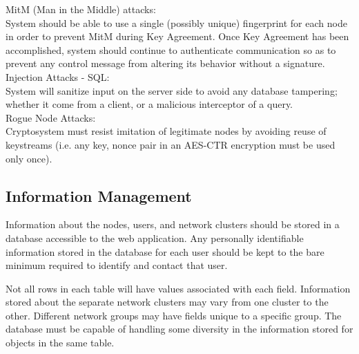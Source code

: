\documentclass[tikz,a4paper,titlepage]{article}
\begin{document}
MitM (Man in the Middle) attacks:\\
System should be able to use a single (possibly unique) fingerprint for each node in order to prevent MitM during Key Agreement. Once Key Agreement has been accomplished, system should continue to authenticate communication so as to prevent any control message from altering its behavior without a signature.\\

Injection Attacks - SQL:\\
System will sanitize input on the server side to avoid any database tampering; whether it come from a client, or a malicious interceptor of a query. \\

Rogue Node Attacks:\\
Cryptosystem must resist imitation of legitimate nodes by avoiding reuse of keystreams (i.e. any key, nonce pair in an AES-CTR encryption must be used only once). \\
    
\subsection{Information Management} %

Information about the nodes, users, and network clusters should be stored in a database accessible to the web application. Any personally identifiable information stored in the database for each user should be kept to the bare minimum required to identify and contact that user. 

Not all rows in each table will have values associated with each field. Information stored about the separate network clusters may vary from one cluster to the other. Different network groups may have fields unique to a specific group. The database must be capable of handling some diversity in the information stored for objects in the same table.  

\end{document}
